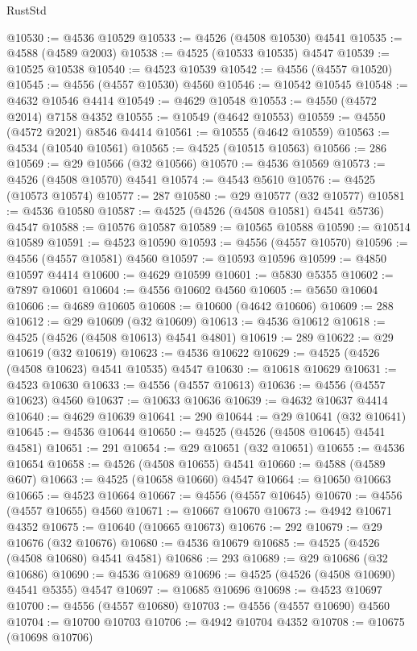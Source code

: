 \begin{lexlean}{RustStd}
\begin{coremodule}
{\begin{coremodule}
{{{{{{{{{{{{{{{{{{{{{{{{{{{{{{{{{{{{{{{{{{{{{{{{{{{{{{{@10530 := @4536 @10529
@10533 := @4526 (@4508 @10530) @4541
@10535 := @4588 (@4589 @2003)
@10538 := @4525 (@10533 @10535) @4547
@10539 := @10525 @10538
@10540 := @4523 @10539
@10542 := @4556 (@4557 @10520)
@10545 := @4556 (@4557 @10530) @4560
@10546 := @10542 @10545
@10548 := @4632 @10546 @4414
@10549 := @4629 @10548
@10553 := @4550 (@4572 @2014) @7158 @4352
@10555 := @10549 (@4642 @10553)
@10559 := @4550 (@4572 @2021) @8546 @4414
@10561 := @10555 (@4642 @10559)
@10563 := @4534 (@10540 @10561)
@10565 := @4525 (@10515 @10563)
@10566 := 286
@10569 := @29 @10566 (@32 @10566)
@10570 := @4536 @10569
@10573 := @4526 (@4508 @10570) @4541
@10574 := @4543 @5610
@10576 := @4525 (@10573 @10574)
@10577 := 287
@10580 := @29 @10577 (@32 @10577)
@10581 := @4536 @10580
@10587 := @4525 (@4526 (@4508 @10581) @4541 @5736) @4547
@10588 := @10576 @10587
@10589 := @10565 @10588
@10590 := @10514 @10589
@10591 := @4523 @10590
@10593 := @4556 (@4557 @10570)
@10596 := @4556 (@4557 @10581) @4560
@10597 := @10593 @10596
@10599 := @4850 @10597 @4414
@10600 := @4629 @10599
@10601 := @5830 @5355
@10602 := @7897 @10601
@10604 := @4556 @10602 @4560
@10605 := @5650 @10604
@10606 := @4689 @10605
@10608 := @10600 (@4642 @10606)
@10609 := 288
@10612 := @29 @10609 (@32 @10609)
@10613 := @4536 @10612
@10618 := @4525 (@4526 (@4508 @10613) @4541 @4801)
@10619 := 289
@10622 := @29 @10619 (@32 @10619)
@10623 := @4536 @10622
@10629 := @4525 (@4526 (@4508 @10623) @4541 @10535) @4547
@10630 := @10618 @10629
@10631 := @4523 @10630
@10633 := @4556 (@4557 @10613)
@10636 := @4556 (@4557 @10623) @4560
@10637 := @10633 @10636
@10639 := @4632 @10637 @4414
@10640 := @4629 @10639
@10641 := 290
@10644 := @29 @10641 (@32 @10641)
@10645 := @4536 @10644
@10650 := @4525 (@4526 (@4508 @10645) @4541 @4581)
@10651 := 291
@10654 := @29 @10651 (@32 @10651)
@10655 := @4536 @10654
@10658 := @4526 (@4508 @10655) @4541
@10660 := @4588 (@4589 @607)
@10663 := @4525 (@10658 @10660) @4547
@10664 := @10650 @10663
@10665 := @4523 @10664
@10667 := @4556 (@4557 @10645)
@10670 := @4556 (@4557 @10655) @4560
@10671 := @10667 @10670
@10673 := @4942 @10671 @4352
@10675 := @10640 (@10665 @10673)
@10676 := 292
@10679 := @29 @10676 (@32 @10676)
@10680 := @4536 @10679
@10685 := @4525 (@4526 (@4508 @10680) @4541 @4581)
@10686 := 293
@10689 := @29 @10686 (@32 @10686)
@10690 := @4536 @10689
@10696 := @4525 (@4526 (@4508 @10690) @4541 @5355) @4547
@10697 := @10685 @10696
@10698 := @4523 @10697
@10700 := @4556 (@4557 @10680)
@10703 := @4556 (@4557 @10690) @4560
@10704 := @10700 @10703
@10706 := @4942 @10704 @4352
@10708 := @10675 (@10698 @10706)
}}}}}}}}}}}}}}}}}}}}}}}}}}}}}}}}}}}}}}}}}}}}}}}}}}}}}}}
\end{coremodule}}
\end{coremodule}
\end{lexlean}
